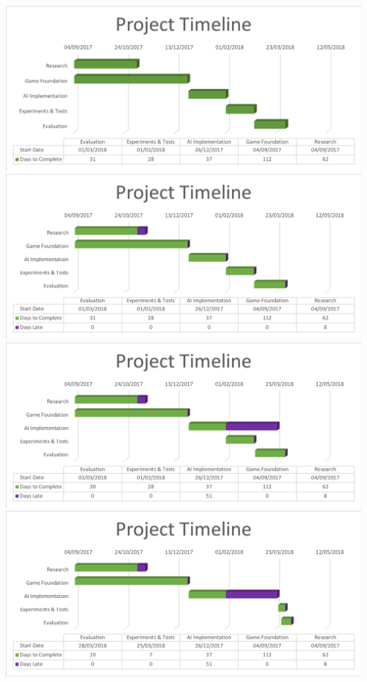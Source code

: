 \documentclass[12pt,a4paper]{article}
\begin{document}
\begin{appendices}
\begin{center}
	{
		\includegraphics[scale = 0.5]{Gantt1.png}
		\includegraphics[scale = 0.5]{Gantt2.png}
		\includegraphics[scale = 0.5]{Gantt3.png}
		\includegraphics[scale = 0.5]{Gantt4.png}
	}
\end{center}
	


\end{appendices}
\end{document}
